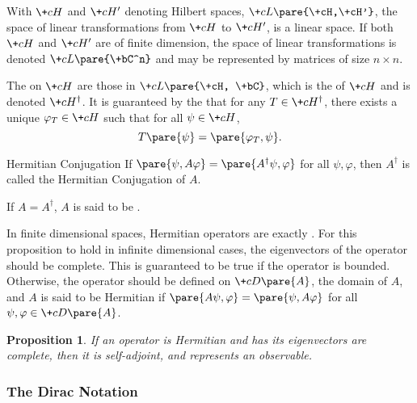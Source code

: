 \documentclass[hidelinks]{article}
\newtheorem{proposition}{Proposition}
\begin{document}
With $\+cH$ and $\+cH'$ denoting Hilbert spaces, $\+cL\pare{\+cH,\+cH'}$, the space of linear transformations from $\+cH$ to $\+cH'$, is a linear space. If both $\+cH$ and $\+cH'$ are of finite dimension, the space of linear transformations is denoted $\+cL\pare{\+bC^n}$ and may be represented by matrices of size $n\times n$.
\par
The  on $\+cH$ are those in $\+cL\pare{\+cH, \+bC}$, which is the  of $\+cH$ and is denoted $\+cH^\dagger$. It is guaranteed by the  that for any $T \in \+cH^\dagger$, there exists a unique $\varphi_T \in \+cH$ such that for all $\psi \in \+cH$,
\[ T\pare{\psi} = \pare{\varphi_T,\psi}. \]
\vspace{-\baselineskip}
\begin{termdef}{Hermitian Conjugation}
    If $\pare{\psi,A\varphi} = \pare{A^\dagger \psi,\varphi}$ for all $\psi,\varphi$, then $A^\dagger$ is called the Hermitian Conjugation of $A$.
\end{termdef}
If $A = A^\dagger$, $A$ is said to be .
\par
In finite dimensional spaces, Hermitian operators are exactly . For this proposition to hold in infinite dimensional cases, the eigenvectors of the operator should be complete. This is guaranteed to be true if the operator is bounded. Otherwise, the operator should be defined on $\+cD\pare{A}$, the domain of $A$, and $A$ is said to be Hermitian if $\pare{A\psi,\varphi} = \pare{\psi,A\varphi}$ for all $\psi,\varphi \in \+cD\pare{A}$.
\begin{proposition}
    If an operator is Hermitian and has its eigenvectors are complete, then it is self-adjoint, and represents an observable.
\end{proposition}


\subsubsection{The Dirac Notation} %
\label{ssub:dirac_notation}
\end{document}
